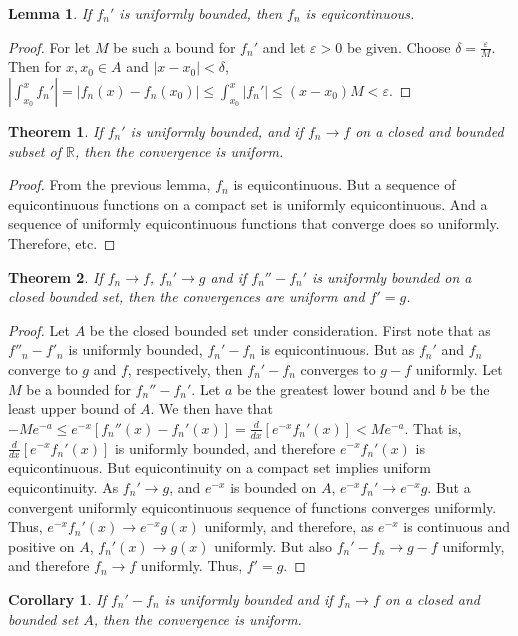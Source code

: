 \documentclass[crop=false,class=book]{standalone}
\theoremstyle{mystyle}
\newtheorem{theorem}{Theorem}[section]
\newtheorem{lemma}{Lemma}[section]
\newtheorem{corollary}{Corollary}[section]
\begin{document}
\begin{lemma}
If $f_n'$ is uniformly bounded, then $f_n$ is equicontinuous.
\end{lemma}
\begin{proof}
For let $M$ be such a bound for $f_n'$ and let $\varepsilon>0$ be given. Choose $\delta = \frac{\varepsilon}{M}$. Then for $x,x_0\in A$ and $|x-x_0|<\delta$, $|\int_{x_0}^{x}f_n'| =|f_n(x)-f_n(x_0)| \leq \int_{x_0}^{x}|f_n'| \leq (x-x_0)M < \varepsilon$.
\end{proof}
\begin{theorem}
If $f_n'$ is uniformly bounded, and if $f_n \rightarrow f$ on a closed and bounded subset of $\mathbb{R}$, then the convergence is uniform.
\end{theorem}
\begin{proof}
From the previous lemma, $f_n$ is equicontinuous. But a sequence of equicontinuous functions on a compact set is uniformly equicontinuous. And a sequence of uniformly equicontinuous functions that converge does so uniformly. Therefore, etc.
\end{proof}
\begin{theorem}
If $f_n \rightarrow f$, $f_n'\rightarrow g$ and if $f_n''-f_n'$ is uniformly bounded on a closed bounded set, then the convergences are uniform and $f' = g$.
\end{theorem}
\begin{proof}
Let $A$ be the closed bounded set under consideration. First note that as $f''_n - f'_n$ is uniformly bounded, $f_n'-f_n$ is equicontinuous. But as $f_n'$ and $f_n$ converge to $g$ and $f$, respectively, then $f_n'-f_n$ converges to $g-f$ uniformly. Let $M$ be a bounded for $f_n''-f_n'$. Let $a$ be the greatest lower bound and $b$ be the least upper bound of $A$. We then have that $-Me^{-a}\leq e^{-x}[f_n''(x)-f_n'(x)]=\frac{d}{dx}[e^{-x}f_n'(x)] < Me^{-a}$. That is, $\frac{d}{dx}[e^{-x}f_n'(x)]$ is uniformly bounded, and therefore $e^{-x}f_n'(x)$ is equicontinuous. But equicontinuity on a compact set implies uniform equicontinuity. As $f_n'\rightarrow g$, and $e^{-x}$ is bounded on $A$, $e^{-x}f_n'\rightarrow e^{-x}g$. But a convergent uniformly equicontinuous sequence of functions converges uniformly. Thus, $e^{-x}f_n'(x) \rightarrow e^{-x}g(x)$ uniformly, and therefore, as $e^{-x}$ is continuous and positive on $A$, $f_n'(x)\rightarrow g(x)$ uniformly. But also $f_n'-f_n \rightarrow g-f$ uniformly, and therefore $f_n \rightarrow f$ uniformly. Thus, $f'=g$.
\end{proof}
\begin{corollary}
If $f_n' - f_n$ is uniformly bounded and if $f_n \rightarrow f$ on a closed and bounded set $A$, then the convergence is uniform.
\end{corollary}
\end{document}
